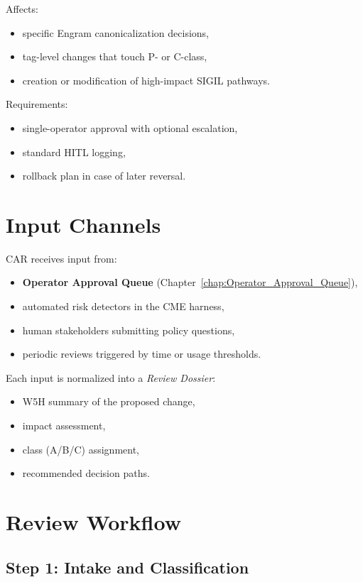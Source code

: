 Affects:
\begin{itemize}
    \item specific Engram canonicalization decisions,
    \item tag-level changes that touch P- or C-class,
    \item creation or modification of high-impact SIGIL pathways.
\end{itemize}

Requirements:
\begin{itemize}
    \item single-operator approval with optional escalation,
    \item standard HITL logging,
    \item rollback plan in case of later reversal.
\end{itemize}

\section{Input Channels}

CAR receives input from:

\begin{itemize}
    \item \textbf{Operator Approval Queue} (Chapter~\ref{chap:Operator_Approval_Queue}),
    \item automated risk detectors in the CME harness,
    \item human stakeholders submitting policy questions,
    \item periodic reviews triggered by time or usage thresholds.
\end{itemize}

Each input is normalized into a \emph{Review Dossier}:
\begin{itemize}
    \item W5H summary of the proposed change,
    \item impact assessment,
    \item class (A/B/C) assignment,
    \item recommended decision paths.
\end{itemize}

\section{Review Workflow}

\subsection{Step 1: Intake and Classification}

